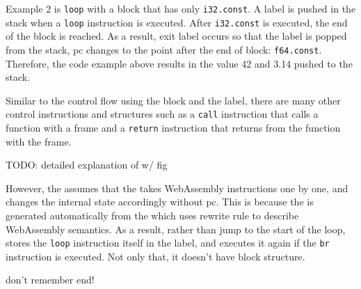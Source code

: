 Example 2 is \texttt{loop} with a block that has only \texttt{i32.const}.
A label is pushed in the stack when a \texttt{loop} instruction is executed.
After \texttt{i32.const} is executed, the end of the block is reached.
As a result, exit label occurs so that the label is popped from the stack,
pc changes to the point after the end of block: \texttt{f64.const}.
Therefore, the code example above results in the value 42 and 3.14 pushed to
the stack.

Similar to the control flow using the block and the label, there are many other
control instructions and structures such as a \texttt{call} instruction that
calls a function with a frame and a \texttt{return} instruction that returns from
the function with the frame.


TODO: detailed explanation of \spectecp{} w/ fig

However, the \spectecp{} assumes that the  takes WebAssembly
instructions one by one, and changes the internal state accordingly without pc.
This is because the \spectecp{} is generated automatically from the 
which uses rewrite rule to describe WebAssembly semantics.
As a result, rather than jump to the start of the loop, \spectecp{} stores the
\texttt{loop} instruction itself in the label, and executes it again if the
\texttt{br} instruction is executed.
Not only that, it doesn't have block structure.

don't remember end!





